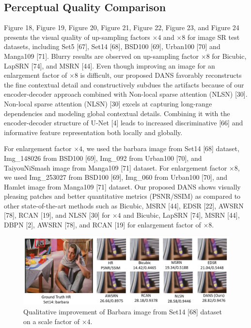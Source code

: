 \documentclass{ieeeaccess}
\begin{document}
\subsection{Perceptual Quality Comparison}
Figure 18, Figure 19, Figure 20, Figure 21, Figure 22, Figure 23, and Figure 24 presents the visual quality of up-sampling factors $\times 4$ and $\times 8$ for image SR test datasets, including Set5 [67], Set14 [68], BSD100 [69], Urban100 [70] and Manga109 [71]. Blurry results are observed on up-sampling factor $\times 8$ for Bicubic, LapSRN [74], and MSRN [44]. Even though improving an image for an enlargement factor of $\times 8$ is difficult, our proposed DANS favorably reconstructs the fine contextual detail and constructively subdues the artifacts because of our encoder-decoder approach combined with Non-local sparse attention (NLSN) [30]. Non-local sparse attention (NLSN) [30] excels at capturing long-range dependencies and modeling global contextual details. Combining it with the encoder-decoder structure of U-Net [4] leads to increased discriminative [66] and informative feature representation both locally and globally. 
\newline

For enlargement factor $\times4$, we used the barbara image from Set14 [68] dataset, Img\_148026 from BSD100 [69], Img\_092 from Urban100 [70], and TaiyouNiSmash image from Manga109 [71] dataset. For enlargement factor $\times8$, we used Img\_253027 from BSD100 [69],  Img\_060 from Urban100 [70], and Hamlet image from Manga109 [71] dataset. Our proposed DANS shows visually pleasing patches and better quantitative metrics (PSNR/SSIM) as compared to other state-of-the-art methods such as Bicubic, MSRN [44], EDSR [22], AWSRN [78], RCAN [19], and NLSN [30] for $\times4$ and Bicubic, LapSRN [74], MSRN [44], DBPN [2], AWSRN [78], and RCAN [19] for enlargement factor of $\times8$. 

\begin{figure}
    \centering

    \includegraphics[width=\linewidth]{18Figure.png}
    \caption{Qualitative improvement of Barbara image from Set14 [68] dataset on a scale factor of $\times4$.}
    \label{fig:18}
\end{figure}
\end{document}
